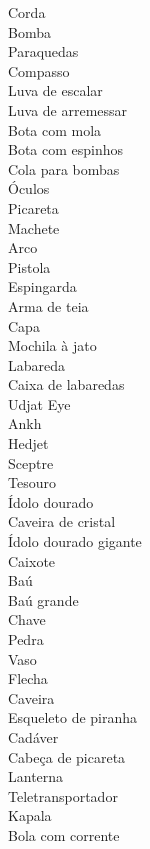 \begin{description}
    \item[Corda]
    \item[Bomba]
    \item[Paraquedas]
    \item[Compasso]
    \item[Luva de escalar]
    \item[Luva de arremessar]
    \item[Bota com mola]
    \item[Bota com espinhos]
    \item[Cola para bombas]
    \item[Óculos]
    \item[Picareta]
    \item[Machete]
    \item[Arco]
    \item[Pistola]
    \item[Espingarda]
    \item[Arma de teia]
    \item[Capa]
    \item[Mochila à jato]
    \item[Labareda]
    \item[Caixa de labaredas]
    \item[Udjat Eye]
    \item[Ankh]
    \item[Hedjet]
    \item[Sceptre]
    \item[Tesouro]
    \item[Ídolo dourado]
    \item[Caveira de cristal]
    \item[Ídolo dourado gigante]
    \item[Caixote]
    \item[Baú]
    \item[Baú grande]
    \item[Chave]
    \item[Pedra]
    \item[Vaso]
    \item[Flecha]
    \item[Caveira]
    \item[Esqueleto de piranha]
    \item[Cadáver]
    \item[Cabeça de picareta]
    \item[Lanterna]
    \item[Teletransportador]
    \item[Kapala]
    \item[Bola com corrente]
\end{description}
